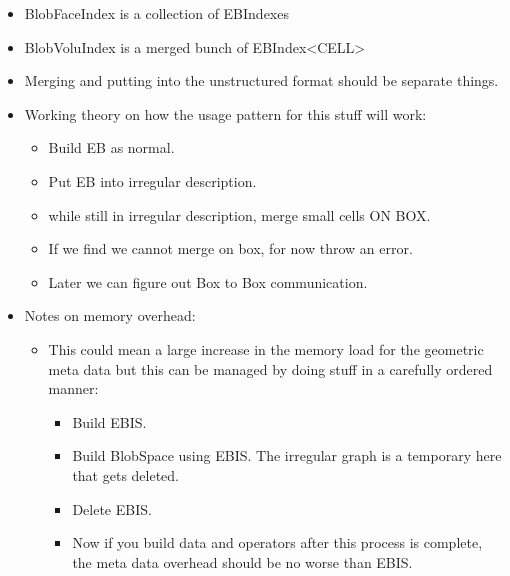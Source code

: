 \begin{itemize}
\item BlobFaceIndex is a collection of EBIndexes
\item BlobVoluIndex is a merged bunch of EBIndex<CELL>
\item Merging and putting into the unstructured format should be
  separate things.
\item Working theory on how the usage pattern for this stuff will work:
  \begin{itemize}
  \item Build EB as normal.
  \item Put EB into irregular description.
    \item while still in irregular description, merge small cells ON
      BOX.
    \item  If we find we cannot merge on box, for now throw an error.
    \item  Later we can figure out Box to Box communication.
  \end{itemize}
\item Notes on memory overhead:
  \begin{itemize}
    \item This could mean  a large increase in the memory load for the
      geometric meta data but this can be managed by doing stuff in a
      carefully ordered manner:
      \begin{itemize}
      \item Build EBIS.
      \item Build BlobSpace using EBIS.  The irregular graph is a
        temporary here that gets deleted.
      \item Delete EBIS.
      \item Now if you build data and operators after this process is
        complete, the meta data overhead should be no worse than EBIS.
      \end{itemize}
      
  \end{itemize}

\end{itemize}
  
